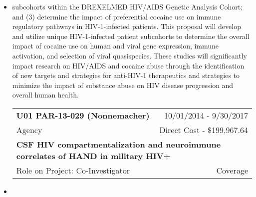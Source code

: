 \documentclass[a4paper,11pt]{article}
\makeatletter
\newenvironment{fullwidth}
    {\par
     \setlength{\@totalleftmargin}{0pt}%
     \setlength{\linewidth}{\hsize}%
     \list{}{\setlength{\leftmargin}{0pt}}
     \item\relax}
    {\endlist}
\makeatother
\begin{document}
\begin{enumerate}
\begin{itemize}
\begin{fullwidth}
subcohorts within the DREXELMED HIV/AIDS Genetic Analysis Cohort; and (3) determine the impact of preferential cocaine use on immune regulatory pathways in HIV-1-infected patients.  This proposal will develop and utilize unique HIV-1-infected patient subcohorts to determine the overall impact of cocaine use on human and viral gene expression, immune activation, and selection of viral quasispecies.  These studies will significantly impact research on HIV/AIDS and cocaine abuse through the identification of new targets and strategies for anti-HIV-1 therapeutics and strategies to minimize the impact of substance abuse on HIV disease progression and overall human health.
   \end{fullwidth}

  \begin{longtable}{lr}
    \textbf{U01 PAR-13-029 (Nonnemacher)} & 10/01/2014 - 9/30/2017 \\
    Agency & Direct Cost - \$199,967.64 \\
    \multicolumn{2}{p{0.973\textwidth}}{\bfseries  CSF HIV compartmentalization and neuroimmune correlates of HAND in military HIV+ } \\
    Role on Project:  Co-Investigator & Coverage \\
    \end{longtable}
    \begin{fullwidth}

\end{fullwidth}
\end{itemize}
\end{enumerate}
\end{document}
